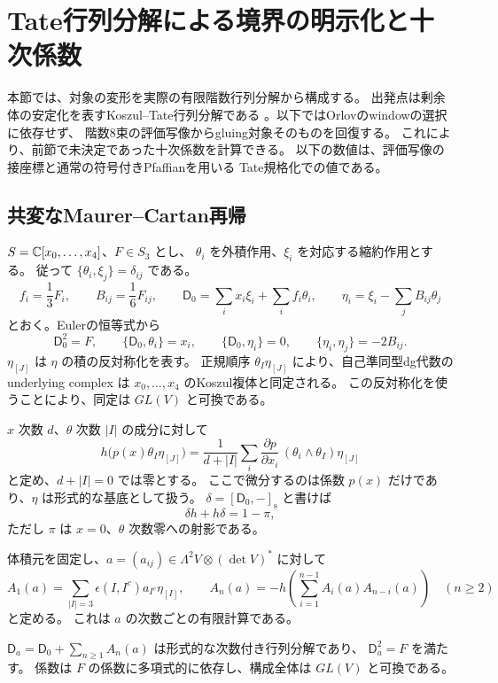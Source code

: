 \section{Tate行列分解による境界の明示化と十次係数}
\label{sec:tate-boundary-tenth}

本節では、対象の変形を実際の有限階数行列分解から構成する。
出発点は剰余体の安定化を表すKoszul--Tate行列分解である
\cite[\S\S 2.3, 4.1]{DyckerhoffMF}。以下ではOrlovのwindowの選択に依存せず、
階数8束の評価写像からgluing対象そのものを回復する。
これにより、前節で未決定であった十次係数を計算できる。
以下の数値は、評価写像の接座標と通常の符号付きPfaffianを用いる
Tate規格化での値である。

\subsection{共変なMaurer--Cartan再帰}

$S=\mathbb C[x_0,\ldots,x_4]$、$F\in S_3$ とし、
$\theta_i$ を外積作用、$\xi_i$ を対応する縮約作用とする。
従って $\{\theta_i,\xi_j\}=\delta_{ij}$ である。
\[
 f_i=\frac13F_i,\qquad B_{ij}=\frac16F_{ij},\qquad
 \mathsf D_0=\sum_i x_i\xi_i+\sum_i f_i\theta_i,
 \qquad \eta_i=\xi_i-\sum_jB_{ij}\theta_j
\]
とおく。Eulerの恒等式から
\[
 \mathsf D_0^2=F,\qquad \{\mathsf D_0,\theta_i\}=x_i,\qquad
 \{\mathsf D_0,\eta_i\}=0,\qquad \{\eta_i,\eta_j\}=-2B_{ij}.
 \tag{T1}\label{eq:tate-clifford-relations}
\]
$\eta_{[J]}$ は $\eta$ の積の反対称化を表す。
正規順序 $\theta_I\eta_{[J]}$ により、自己準同型dg代数の underlying
complex は $x_0,\ldots,x_4$ のKoszul複体と同定される。
この反対称化を使うことにより、同定は $GL(V)$ と可換である。

$x$ 次数 $d$、$\theta$ 次数 $|I|$ の成分に対して
\[
 h\bigl(p(x)\theta_I\eta_{[J]}\bigr)
 =\frac1{d+|I|}\sum_i
   \frac{\partial p}{\partial x_i}\,
   (\theta_i\wedge\theta_I)\eta_{[J]}
 \tag{T2}\label{eq:tate-homotopy}
\]
と定め、$d+|I|=0$ では零とする。
ここで微分するのは係数 $p(x)$ だけであり、$\eta$ は形式的な基底として扱う。
$\delta=[\mathsf D_0,-]_{\mathrm s}$ と書けば
\[
 \delta h+h\delta=1-\pi,
\]
ただし $\pi$ は $x=0$、$\theta$ 次数零への射影である。

体積元を固定し、$a=(a_{ij})\in\Lambda^2V\otimes(\det V)^*$ に対して
\[
 A_1(a)=\sum_{|I|=3}\epsilon(I,I^c)a_{I^c}\eta_{[I]},
 \qquad
 A_n(a)=-h\left(\sum_{i=1}^{n-1}A_i(a)A_{n-i}(a)\right)
 \quad(n\ge2)
 \tag{T3}\label{eq:tate-mc-recurrence}
\]
と定める。
これは $a$ の次数ごとの有限計算である。

\begin{lemma}[再帰の正当性]\label{lem:tate-mc-existence}
$\mathsf D_a=\mathsf D_0+\sum_{n\ge1}A_n(a)$ は形式的な次数付き行列分解であり、
$\mathsf D_a^2=F$ を満たす。
係数は $F$ の係数に多項式的に依存し、構成全体は $GL(V)$ と可換である。
\end{lemma}

